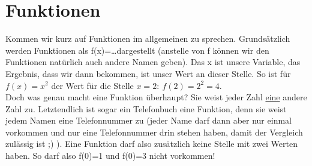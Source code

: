 \section{Funktionen}
	Kommen wir kurz auf Funktionen im allgemeinen zu sprechen. Grundsätzlich werden
	Funktionen als f(x)=\ldots dargestellt (anstelle von f können wir den
	Funktionen natürlich auch andere Namen geben). Das x ist unsere Variable, das
	Ergebnis, dass wir dann bekommen, ist unser Wert an dieser Stelle. So ist für
	\(f(x)=x^2\) der Wert für die Stelle \(x=2:\ f(2)=2^2=4\).\\
	Doch was genau macht eine Funktion überhaupt? Sie weist jeder Zahl
	\underline{eine} andere Zahl zu. Letztendlich ist sogar ein Telefonbuch eine
	Funktion, denn sie weist jedem Namen eine Telefonnummer zu (jeder Name darf
	dann aber nur einmal vorkommen und nur eine Telefonnummer drin stehen haben,
	damit der Vergleich zulässig ist ;) ). Eine Funktion darf also zusätzlich keine
	Stelle mit zwei Werten haben. So darf also f(0)=1 und f(0)=3 nicht vorkommen!

	

	

	
